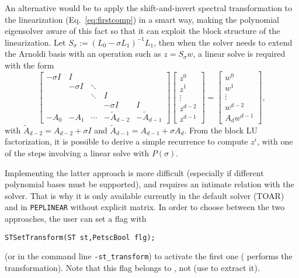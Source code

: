 An alternative would be to apply the shift-and-invert spectral transformation to the linearization (Eq.\ \ref{eq:firstcomp}) in a smart way, making the polynomial eigensolver aware of this fact so that it can exploit the block structure of the linearization.
Let $S_\sigma:=(L_0-\sigma L_1)^{-1}L_1$, then when the solver needs to extend the Arnoldi basis with an operation such as $z=S_\sigma w$, a linear solve is required with the form
\begin{equation}
\label{eq:sinvpeplin}
\begin{bmatrix}
  -\sigma I  & I \\
  & -\sigma I & \ddots \\
  & & \ddots & I \\
  & & & -\sigma I & I \\
  -A_0 & -A_1 & \cdots  & -\tilde{A}_{d-2} & -\tilde{A}_{d-1}
\end{bmatrix}
\begin{bmatrix}
  z^0\\z^1\\\vdots\\z^{d-2}\\z^{d-1}
\end{bmatrix}
  =
\begin{bmatrix}
  w^0\\w^1\\\vdots\\w^{d-2}\\A_dw^{d-1}
\end{bmatrix},
\end{equation}
with $\tilde{A}_{d-2}=A_{d-2}+\sigma I$ and $\tilde{A}_{d-1}=A_{d-1}+\sigma A_d$.
From the block LU factorization, it is possible to derive a simple recurrence to compute $z^i$, with one of the steps involving a linear solve with $P(\sigma)$.

Implementing the latter approach is more difficult (especially if different polynomial bases must be supported), and requires an intimate relation with the  solver. That is why it is only available currently in the default solver (TOAR) and in \texttt{PEPLINEAR} without explicit matrix. In order to choose between the two approaches, the user can set a flag with
	\begin{Verbatim}[fontsize=\small]
	STSetTransform(ST st,PetscBool flg);
	\end{Verbatim}
(or in the command line \Verb!-st_transform!) to activate the first one ( performs the transformation). Note that this flag belongs to , not  (use  to extract it).

